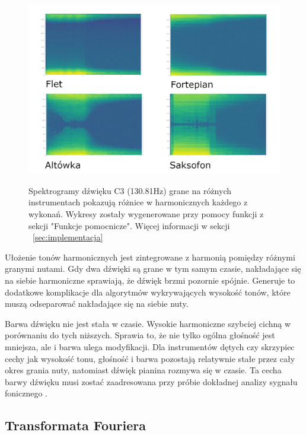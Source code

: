 \documentclass[12pt,a4paper,twoside]{mwart}
\begin{document}
\begin{figure}[H]
  \begin{center}
  \includegraphics[scale=1.35]{images/spectogram_instruments.png}\\
  \caption{Spektrogramy dźwięku C3 (130.81Hz) grane na różnych instrumentach pokazują różnice w harmonicznych każdego z wykonań. Wykresy zostały wygenerowane przy pomocy funkcji z sekcji "Funkcje pomocnicze". Więcej informacji w sekcji ~\ref{sec:implementacja}}
  \end{center}
\end{figure}

Ułożenie tonów harmonicznych jest zintegrowane z harmonią pomiędzy różnymi granymi nutami. Gdy dwa dźwięki są grane w tym samym czasie, nakładające się na siebie harmoniczne sprawiają, że dźwięk brzmi pozornie spójnie. Generuje to dodatkowe komplikacje dla algorytmów wykrywających wysokość tonów, które muszą odseparować nakładające się na siebie nuty.

Barwa dźwięku nie jest stała w czasie. Wysokie harmoniczne szybciej cichną w porównaniu do tych niższych. Sprawia to, że nie tylko ogólna głośność jest mniejsza, ale i barwa ulega modyfikacji. Dla instrumentów dętych czy skrzypiec cechy jak wysokość tonu, głośność i barwa pozostają relatywnie stałe przez cały okres grania nuty, natomiast dźwięk pianina rozmywa się w czasie. Ta cecha barwy dźwięku musi zostać zaadresowana przy próbie dokładnej analizy sygnału fonicznego \cite[64-65]{Homerecording:DlaKazdego}.

\subsection{Transformata Fouriera}
\newpage
\end{document}
